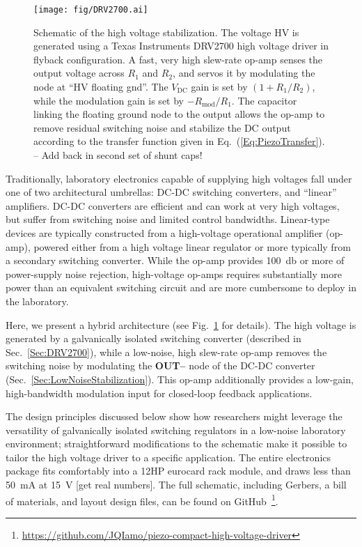 \documentclass[aip,rsi,preprint,graphicx]{revtex4-1} %
\begin{document}
\begin{figure}[t]
\texttt{[image: fig/DRV2700.ai]}
\caption{Schematic of the high voltage stabilization.
The voltage HV is generated using a Texas Instruments DRV2700 high voltage driver in flyback configuration.
A fast, very high slew-rate op-amp senses the output voltage across $R_1$ and $R_2$, and servos it by modulating the node at ``HV floating gnd''.
The $V_{\text{DC}}$ gain is set by $\left(1+R_1/R_2\right)$, while the modulation gain is set by $-R_{\text{mod}}/R_1$.
The capacitor linking the floating ground node to the output allows the op-amp to remove residual switching noise and stabilize the DC output according to the transfer function given in Eq.~(\ref{Eq:PiezoTransfer}). -- Add back in second set of shunt caps!\label{Fig:PiezoCircuit}}
\end{figure}

Traditionally, laboratory electronics capable of supplying high voltages fall under one of two architectural umbrellas: DC-DC switching converters, and ``linear'' amplifiers.
DC-DC converters are efficient and can work at very high voltages, but suffer from switching noise and limited control bandwidths.
Linear-type devices are typically constructed from a high-voltage operational amplifier (op-amp), powered either from a high voltage linear regulator or more typically from a secondary switching converter.
While the op-amp provides \SI{100}{\decibel} or more of power-supply noise rejection, high-voltage op-amps requires substantially more power than an equivalent switching circuit and are more cumbersome to deploy in the laboratory.

Here, we present a hybrid architecture (see Fig.~\ref{Fig:PiezoCircuit} for details).
The high voltage is generated by a galvanically isolated switching converter (described in Sec.~\ref{Sec:DRV2700}), while a low-noise, high slew-rate op-amp removes the switching noise by modulating the \textbf{OUT--} node of the DC-DC converter (Sec.~\ref{Sec:LowNoiseStabilization}).
This op-amp additionally provides a low-gain, high-bandwidth modulation input for closed-loop feedback applications.

The design principles discussed below show how researchers might leverage the versatility of galvanically isolated switching regulators in a low-noise laboratory environment; straightforward modifications to the schematic make it possible to tailor the high voltage driver to a specific application.
The entire electronics package fits comfortably into a 12HP eurocard rack module, and draws less than \SI{50}{\milli\ampere} at \SI{15}{\volt} [get real numbers].
The full schematic, including Gerbers, a bill of materials, and layout design files, can be found on GitHub~\footnote{\protect\url{https://github.com/JQIamo/piezo-compact-high-voltage-driver}}.
\end{document}
